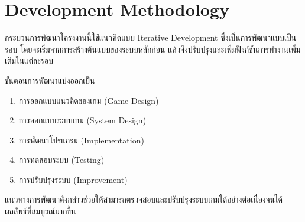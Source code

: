 \section{Development Methodology}

กระบวนการพัฒนาโครงงานนี้ใช้แนวคิดแบบ Iterative Development ซึ่งเป็นการพัฒนาแบบเป็นรอบ โดยจะเริ่มจากการสร้างต้นแบบของระบบหลักก่อน แล้วจึงปรับปรุงและเพิ่มฟังก์ชันการทำงานเพิ่มเติมในแต่ละรอบ

ขั้นตอนการพัฒนาแบ่งออกเป็น

\begin{enumerate}
\item การออกแบบแนวคิดของเกม (Game Design)
\item การออกแบบระบบเกม (System Design)
\item การพัฒนาโปรแกรม (Implementation)
\item การทดสอบระบบ (Testing)
\item การปรับปรุงระบบ (Improvement)
\end{enumerate}

แนวทางการพัฒนาดังกล่าวช่วยให้สามารถตรวจสอบและปรับปรุงระบบเกมได้อย่างต่อเนื่องจนได้ผลลัพธ์ที่สมบูรณ์มากขึ้น